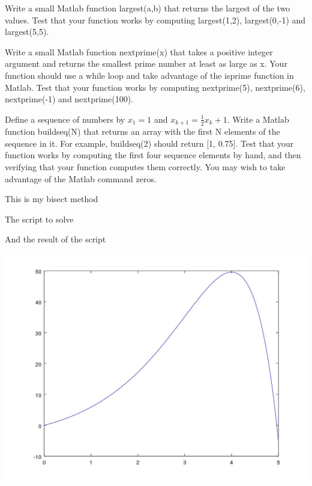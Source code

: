 \documentclass[12pt]{article}
\makeatletter
\theoremstyle{homework}
\newenvironment{exercise}[1]
{\def\@currentlabel{#1}\exercisecore}
{\endexercisecore}
\makeatother
\begin{document}
\begin{exercise}{1}
Write a small Matlab function largest(a,b) that returns the largest of the two values.
Test that your function works by computing largest(1,2), largest(0,-1) and
largest(5,5).
\end{exercise}



\newpage
\begin{exercise}{2}
Write a small Matlab function nextprime(x) that takes a positive integer argument and
returns the smallest prime number at least as large as x. Your function should use a while
loop and take advantage of the isprime function in Matlab. Test that your function
works by computing nextprime(5), nextprime(6), nextprime(-1) and nextprime(100).

\end{exercise}


\newpage
\begin{exercise}{3}
Define a sequence of numbers by $x_1 = 1$ and $x_{k+1} =\frac{1}{2}x_k + 1$. Write a Matlab function
buildseq(N) that returns an array with the first N elements of the sequence in it. For
example, buildseq(2) should return [1, 0.75]. Test that your function works by computing
the first four sequence elements by hand, and then verifying that your function computes
them correctly. You may wish to take advantage of the Matlab command zeros.
\end{exercise}



\newpage
\begin{exercise}{Chapter 4: 2(a)}
\end{exercise}
This is my bisect method


The script to solve


\newpage
And the result of the script

\includegraphics[scale=.5]{../octave/q4fig.jpg}
\end{document}
